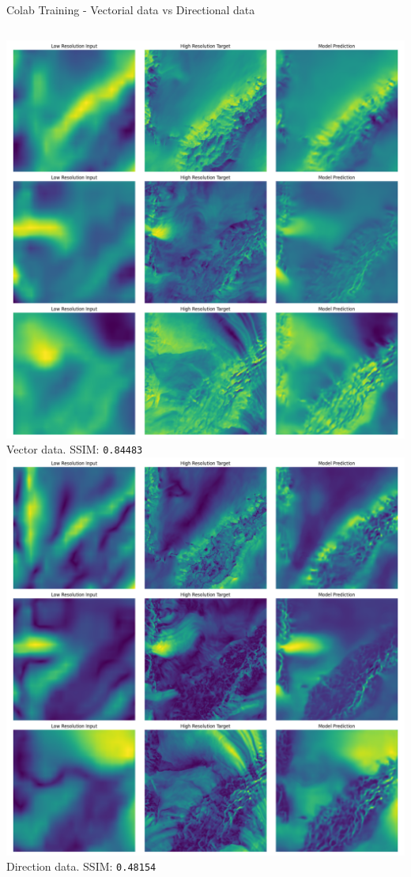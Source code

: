 \documentclass[footline=authortitle]{beamer}
\begin{document}
\begin{frame}{Colab Training - Vectorial data vs Directional data}
    \begin{columns}
            \includegraphics[width=\linewidth]{images/colab_vector_unet_L1SSIM_loss_300_epochs_8_batch_1em3_lr_1em5_weightdecay_best.pt.png}
            \newline
            \centering \small Vector data. SSIM: \texttt{0.84483}
            \includegraphics[width=\linewidth]{images/colab_direction_unet_L1SSIM_loss_150_epochs_4_batch_1em3_lr_1em5_weightdecay_best.pt.png}
            \newline
            \centering \small Direction data. SSIM: \texttt{0.48154}
    \end{columns}
\end{frame}
\end{document}
